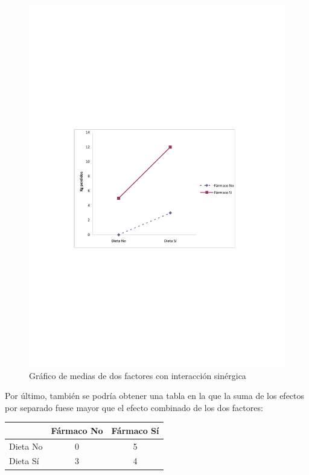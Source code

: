 \documentclass[
  a4paper,
]{scrreport}
\theoremstyle{plain}
\theoremstyle{definition}
\theoremstyle{definition}
\theoremstyle{remark}
\begin{document}
\begin{figure}[H]

{\centering \includegraphics{img/anova-ancova/coninteraccion1.pdf}

}

\caption{Gráfico de medias de dos factores con interacción sinérgica}

\end{figure}%

Por último, también se podría obtener una tabla en la que la suma de los
efectos por separado fuese mayor que el efecto combinado de los dos
factores:

\begin{longtable}[]{@{}lcc@{}}
\toprule\noalign{}
& Fármaco No & Fármaco Sí \\
\midrule\noalign{}
\endhead
\bottomrule\noalign{}
\endlastfoot
Dieta No & 0 & 5 \\
Dieta Sí & 3 & 4 \\
\end{longtable}
\end{document}

